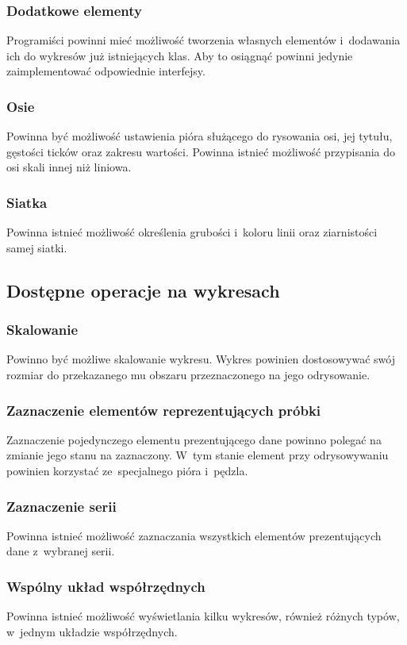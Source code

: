 \subsubsection{Dodatkowe elementy}
Programiści powinni mieć możliwość tworzenia własnych elementów i~dodawania ich do wykresów już istniejących klas. Aby to osiągnąć powinni jedynie zaimplementować odpowiednie interfejsy.

\subsubsection{Osie}
Powinna być możliwość ustawienia pióra służącego do rysowania osi, jej tytułu, gęstości ticków oraz zakresu wartości. Powinna istnieć możliwość przypisania do osi skali innej niż liniowa.

\subsubsection{Siatka}
Powinna istnieć możliwość określenia grubości i~koloru linii oraz ziarnistości samej siatki.

\subsection{Dostępne operacje na wykresach}
\subsubsection{Skalowanie}
Powinno być możliwe skalowanie wykresu. Wykres powinien dostosowywać swój rozmiar do przekazanego mu obszaru przeznaczonego na jego odrysowanie.

\subsubsection{Zaznaczenie elementów reprezentujących próbki}
Zaznaczenie pojedynczego elementu prezentującego dane powinno polegać na zmianie jego stanu na zaznaczony. W~tym stanie element przy odrysowywaniu powinien korzystać ze~specjalnego pióra i~pędzla.

\subsubsection{Zaznaczenie serii}
Powinna istnieć możliwość zaznaczania wszystkich elementów prezentujących dane z~wybranej serii.

\subsubsection{Wspólny układ współrzędnych}
Powinna istnieć możliwość wyświetlania kilku wykresów, również różnych typów, w~jednym układzie współrzędnych.

